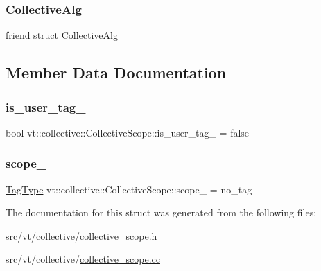 \subsubsection{\texorpdfstring{Collective\+Alg}{CollectiveAlg}}
{\footnotesize\ttfamily friend struct \hyperlink{structvt_1_1collective_1_1_collective_alg}{Collective\+Alg}\hspace{0.3cm}{\ttfamily [friend]}}



\subsection{Member Data Documentation}
\mbox{\label{structvt_1_1collective_1_1_collective_scope_a2a291ca3421aab53d63088bd84fd7091}} 
\subsubsection{\texorpdfstring{is\+\_\+user\+\_\+tag\+\_\+}{is\_user\_tag\_}}
{\footnotesize\ttfamily bool vt\+::collective\+::\+Collective\+Scope\+::is\+\_\+user\+\_\+tag\+\_\+ = false\hspace{0.3cm}{\ttfamily [private]}}

\mbox{\label{structvt_1_1collective_1_1_collective_scope_a6a1b0fe51f68913bd2aeaed363a5eab9}} 
\subsubsection{\texorpdfstring{scope\+\_\+}{scope\_}}
{\footnotesize\ttfamily \hyperlink{namespacevt_a84ab281dae04a52a4b243d6bf62d0e52}{Tag\+Type} vt\+::collective\+::\+Collective\+Scope\+::scope\+\_\+ = no\+\_\+tag\hspace{0.3cm}{\ttfamily [private]}}



The documentation for this struct was generated from the following files\+:\begin{DoxyCompactItemize}
\item 
src/vt/collective/\hyperlink{collective__scope_8h}{collective\+\_\+scope.\+h}\item 
src/vt/collective/\hyperlink{collective__scope_8cc}{collective\+\_\+scope.\+cc}\end{DoxyCompactItemize}

